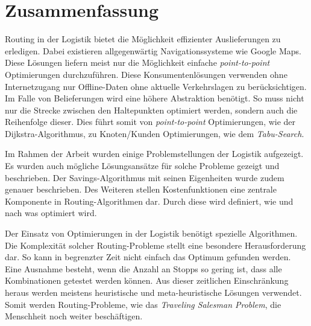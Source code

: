 \chapter{Zusammenfassung}
\label{Zusammenfassung}

Routing in der Logistik bietet die Möglichkeit effizienter Auslieferungen zu erledigen. 
Dabei existieren allgegenwärtig Navigationssysteme wie Google Maps. 
Diese Lösungen liefern meist nur die Möglichkeit einfache \textit{point-to-point} Optimierungen durchzuführen. 
Diese Konsumentenlösungen verwenden ohne Internetzugang nur Offline-Daten ohne aktuelle Verkehrslagen zu berücksichtigen. 
Im Falle von Belieferungen wird eine höhere Abstraktion benötigt.
So muss nicht nur die Strecke zwischen den Haltepunkten optimiert werden, sondern auch die Reihenfolge dieser. 
Dies führt somit von \textit{point-to-point} Optimierungen, wie der Dijkstra-Algorithmus, zu Knoten/Kunden Optimierungen, wie dem \textit{Tabu-Search}. 

\noindent
Im Rahmen der Arbeit wurden einige Problemstellungen der Logistik aufgezeigt. 
Es wurden auch mögliche Lösungsansätze für solche Probleme gezeigt und beschrieben. 
Der Savings-Algorithmus mit seinen Eigenheiten wurde zudem genauer beschrieben. 
Des Weiteren stellen Kostenfunktionen eine zentrale Komponente in Routing-Algorithmen dar. 
Durch diese wird definiert, wie und nach was optimiert wird. 

\noindent
Der Einsatz von Optimierungen in der Logistik benötigt spezielle Algorithmen. 
Die Komplexität solcher Routing-Probleme stellt eine besondere Herausforderung dar. 
So kann in begrenzter Zeit nicht einfach das Optimum gefunden werden.
Eine Ausnahme besteht, wenn die Anzahl an Stopps so gering ist, dass alle Kombinationen getestet werden können. 
Aus dieser zeitlichen Einschränkung heraus werden meistens heuristische und meta-heuristische Lösungen verwendet. 
Somit werden Routing-Probleme, wie das \textit{Traveling Salesman Problem}, die Menschheit noch weiter beschäftigen. 